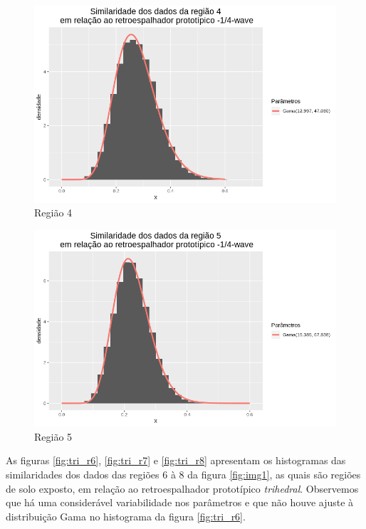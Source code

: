 \documentclass[12pt]{article}
\begin{document}
\begin{figure}[!h]
    \centering
    \vspace{0.1\linewidth}
    \includegraphics[width = \linewidth]{../../Images/Report_18_12_20/nwv_region4.png}
    \caption{Região 4}
    \label{fig:nwv_r4}
\end{figure}

\begin{figure}[!h]
    \centering
    \includegraphics[width = \linewidth]{../../Images/Report_18_12_20/nwv_region5.png}
    \caption{Região 5}
    \label{fig:nwv_r5}
\end{figure}

As figuras \ref{fig:tri_r6}, \ref{fig:tri_r7} e \ref{fig:tri_r8} apresentam os histogramas das similaridades dos dados das regiões 6 à 8 da figura \ref{fig:img1}, as quais são regiões de solo exposto, em relação ao retroespalhador prototípico \textit{trihedral}. Observemos que há uma considerável variabilidade nos parâmetros e que não houve ajuste à distribuição Gama no histograma da figura \ref{fig:tri_r6}. 
\end{document}
